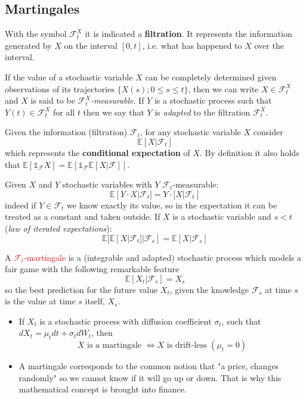 \documentclass[12pt,a4paper]{book}
\begin{document}
\subsection{Martingales}
With the symbol $\mathcal{F}^X_t$ it is indicated a \textbf{filtration}. It represents the information generated by $X$ on the interval $[0, t]$, i.e. what has happened to $X$ over the interval. 

If the value of a stochastic variable $X$ can be completely determined given observations of its trajectories $\{X(s); 0\leq s \leq t\}$, then we can write $X\in\mathcal{F}_t^X$ and $X$ is said to be $\mathcal{F}_t^X$\emph{-measurable}.
If $Y$ is a stochastic process such that $Y(t)\in\mathcal{F}_t^X$ for all $t$ then we say that $Y$ is \emph{adapted} to the filtration $\mathcal{F}_t^X$. 

Given the information (filtration) $\mathcal{F}_t$, for any stochastic variable $X$ consider
\begin{equation*}
	\mathbb{E}[X|\mathcal{F}_t]
\end{equation*}
which represents the \textbf{conditional expectation} of $X$.
By definition it also holds that $\mathbb{E}[\mathbb{1}_{\mathcal{F}}X] = \mathbb{E}[\mathbb{1}_{\mathcal{F}}\mathbb{E}[X|\mathcal{F}]]$.

Given $X$ and $Y$ stochastic variables with $Y$ $\mathcal{F}_t$-measurable:
\begin{equation*}
\mathbb{E}[Y\cdot X|\mathcal{F}_t] =  Y\cdot\mathbb[X|\mathcal{F}_t]
\end{equation*}
indeed if $Y\in\mathcal{F}_t$ we know exactly its value, so in the expectation it can be treated as a constant and taken outside.
If $X$ is a stochastic variable and $s<t$ (\emph{law of iterated expectations}):
\begin{equation*}
\mathbb{E}[\mathbb{E}[X|\mathcal{F}_t]|\mathcal{F}_s] = \mathbb{E}[X|\mathcal{F}_s]
\end{equation*}

A \textcolor{red}{$\mathcal{F}_t$-martingale} is a (integrable and adapted) stochastic process which models a fair game with the following remarkable feature
\begin{equation}
\mathbb{E}[X_t|\mathcal{F}_s] = X_s
\end{equation}
so the best prediction for the future value $X_t$, given the knowledge $\mathcal{F}_s$ at time $s$ is the value at time $s$ itself, $X_s$.
		
\begin{itemize}
\item If $X_t$ is a stochastic process with diffusion coefficient $\sigma_t$, such that %
$dX_t=\mu_t dt+\sigma_t dW_t$, then 
\begin{equation*}
X\text{ is a martingale } \iff X\text{ is drift-less } (\mu_t=0)
\end{equation*}
\item A martingale corresponds to the common notion that "a price, changes randomly" so we cannot know if it will go up or down. That is why this mathematical concept is brought into finance.
\end{itemize}	
	
\end{document}
